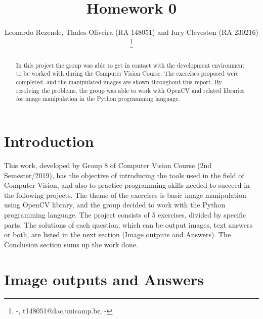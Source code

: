 \documentclass[]{IEEEtran}
\begin{document}
  \title{Homework 0}
  \author{Leonardo Rezende, Thales Oliveira (RA 148051) and Iury Cleveston (RA 230216)
    \thanks{-, t148051@dac.unicamp.br, -}
  }
  \maketitle
  
  \begin{abstract}
    In this project the group was able to get in contact with the development environment to be worked with during the Computer Vision Course. The exercises proposed were completed, and the manipulated images are shown throughout this report. By resolving the problems, the group was able to work with OpenCV and related libraries for image manipulation in the Python programming language.
  \end{abstract}
  
  \section{Introduction}
  
  This work, developed by Group 8 of Computer Vision Course (2nd Semester/2019), has the objective of introducing the tools used in the field of Computer Vision, and also to practice programming skills needed to succeed in the following projects. The theme of the exercises is basic image manipulation using OpenCV library, and the group decided to work with the Python programming language. The project consists of 5 exercises, divided by specific parts. The solutions of each question, which can be output images, text answers or both, are listed in the next section (Image outputs and Answers). The Conclusion section sums up the work done. 


  \section{Image outputs and Answers}
\end{document}
